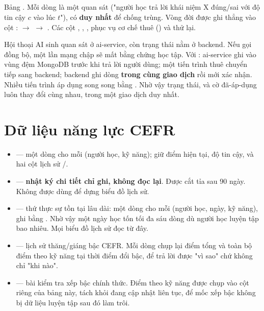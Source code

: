 \subsection{}

Bảng . Mỗi dòng là một quan sát ("người học trả lời khái niệm X đúng/sai với
độ tin cậy $c$ vào lúc $t$"), có  \textbf{duy nhất} để chống trùng.
Vòng đời được ghi thẳng vào cột :  $\rightarrow$
 $\rightarrow$ . Các cột ,
, ,  phục vụ cơ chế thuê
() và thử lại.

\begin{luuy}
Hội thoại AI sinh quan sát ở ai-service, còn trạng thái nằm ở backend. Nếu gọi đồng bộ,
một lần mạng chập sẽ mất bằng chứng học tập. Với : ai-service ghi vào vùng đệm
MongoDB trước khi trả lời người dùng; một tiến trình thuê chuyển tiếp sang backend;
backend ghi dòng  \textbf{trong cùng giao dịch} rồi mới xác nhận. Nhiều tiến
trình áp dụng song song bằng . Nhờ vậy trạng thái,
 và cờ đã-áp-dụng luôn thay đổi cùng nhau, trong một giao dịch duy nhất.
\end{luuy}

\section{Dữ liệu năng lực CEFR}

\begin{itemize}[leftmargin=1.4em]
  \item {} — một dòng cho mỗi (người học, kỹ năng); giữ điểm
  hiện tại, độ tin cậy, và hai cột lịch sử /.
  \item {} — \textbf{nhật ký chi tiết chỉ ghi, không đọc lại}.
  Được cắt tỉa sau 90 ngày. Không được dùng để dựng biểu đồ lịch sử.
  \item {} — thứ thực sự tồn tại lâu dài: một dòng cho mỗi
  (người học, ngày, kỹ năng), ghi bằng . Nhờ vậy một ngày học tốn tối đa sáu
  dòng dù người học luyện tập bao nhiêu. Mọi biểu đồ lịch sử đọc từ đây.
  \item {} — lịch sử thăng/giáng bậc CEFR. Mỗi dòng chụp lại điểm
  tổng và toàn bộ điểm theo kỹ năng tại thời điểm đổi bậc, để trả lời được "vì sao" chứ
  không chỉ "khi nào".
  \item {} — bài kiểm tra xếp bậc chính thức. Điểm theo kỹ
  năng được chụp vào cột riêng của bảng này, tách khỏi  đang
  cập nhật liên tục, để mốc xếp bậc không bị dữ liệu luyện tập sau đó làm trôi.
\end{itemize}


